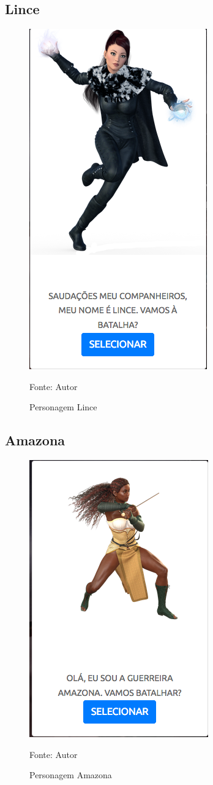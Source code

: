 \subsection{Lince}
\begin{figure}[h]
	\centering
	\includegraphics[keepaspectratio=true,scale=0.5]{figuras/lince.png}
	\caption{Personagem Lince}
	Fonte: Autor
	\label{lince}
\end{figure}

\subsection{Amazona}
\begin{figure}[h]
	\centering
	\includegraphics[keepaspectratio=true,scale=0.5]{figuras/amazona.png}
	\caption{Personagem Amazona}
	Fonte: Autor
	\label{amazona}
\end{figure}

